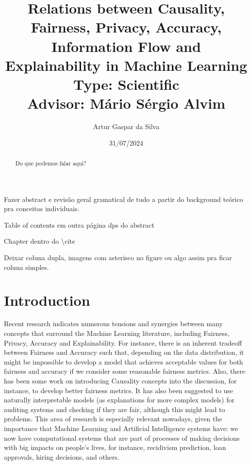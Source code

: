 \documentclass[conference]{IEEEtran}
\title{Relations between Causality, Fairness, Privacy, Accuracy, Information Flow and Explainability in Machine Learning\large\\ Type: Scientific\\Advisor: Mário Sérgio Alvim}
\author{Artur Gaspar da Silva}
\date{31/07/2024}
\begin{document}
\maketitle

{\color{red} Fazer abstract e revisão geral gramatical de tudo a partir do background teórico pra conceitos individuais.}

{\color{red} Table of contents em outra página dps do abstract}

{\color{red} Chapter dentro do \textbackslash cite}

{\color{red} Deixar coluna dupla, imagens com asterisco no figure ou algo assim pra ficar coluna simples. }

\begin{abstract}
    Do que podemos falar aqui?
\end{abstract}

\tableofcontents

\section{Introduction}

Recent research\cite{Sok}\cite{Reductions}\cite{Rachel}\cite{Awareness} indicates numerous tensions and synergies between many concepts that surround the Machine Learning literature, including Fairness, Privacy, Accuracy and Explainability. For instance, there is an inherent tradeoff between Fairness and Accuracy such that, depending on the data distribution, it might be impossible to develop a model that achieves acceptable values for both fairness and accuracy if we consider some reasonable fairness metrics\cite{Carlos}. Also, there has been some work on introducing Causality concepts into the discussion, for instance, to develop better fairness metrics\cite{CausalFair}. It has also been suggested to use naturally interpretable models (as explanations for more complex models) for auditing systems and checking if they are fair, although this might lead to problems\cite{ExplainAll}. This area of research is especially relevant nowadays, given the importance that Machine Learning and Artificial Intelligence systems have: we now have computational systems that are part of processes of making decisions with big impacts on people's lives, for instance, recidivism prediction\cite{Compass}, loan approvals\cite{Loans}, hiring decisions\cite{Jobs}, and others.
\end{document}

